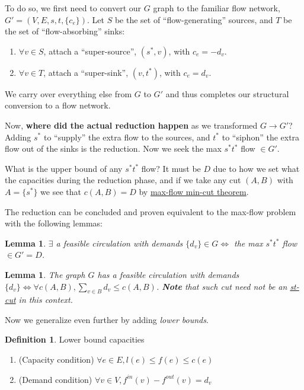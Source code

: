 \documentclass{article}
\newtheorem{lemma}[theorem]{Lemma}
\theoremstyle{definition}
\newtheorem{definition}{Definition}[section]
\begin{document}

To do so, we first need to convert our $G$ graph to the familiar flow network, \hyperref[def:flow_networks]{$G' = (V, E, s,t, \{c_e\})$}.
Let $S$ be the set of ``flow-generating'' sources, and $T$ be the set of ``flow-absorbing'' sinks:

\begin{enumerate}
	\item $\forall v \in S$, attach a ``super-source'', $(s^*,v)$, with $c_e = -d_v$.
	\item $\forall v \in T$, attach a ``super-sink'', $(v,t^*)$, with $c_e = d_v$.
\end{enumerate}

We carry over everything else from $G$ to $G'$ and thus completes our structural conversion to a flow network. 

Now, \textbf{where did the actual reduction happen} as we transformed $G \to G'$? Adding $s^*$ to ``supply'' the extra flow to the sources, and $t^*$ to ``siphon'' the extra flow out of the sinks is the reduction. Now we seek the max $s^*t^*$ flow $\in G'$. 

What is the upper bound of any $s^*t^*$ flow? It must be $D$ due to how we set what the capacities during the reduction phase, and if we take any cut $(A,B)$ with $A = \{s^*\}$ we see that $c(A,B) = D$ by \hyperref[thm:maxflowmincut]{max-flow min-cut theorem}.

The reduction can be concluded and proven equivalent to the max-flow problem with the following lemmas:

\begin{lemma}
	$\exists$ a feasible circulation with demands $\{d_v\} \in G \iff$ the max $s^*t^*$ flow $\in G' = D$. 
\end{lemma}

\begin{lemma}
	The graph $G$ has a feasible circulation with demands $\{d_v\} \iff \forall c(A,B), \sum_{v \in B}{d_v \leq c(A,B)}$. \textbf{Note} that such cut need not be an \hyperref[def:st_cut_cap]{st-cut} in this context.
\end{lemma}

Now we generalize even further by adding \textit{lower bounds}. 

\begin{definition}{Lower bound capacities}
	\label{def:low_bounds}	
		\begin{enumerate}
			\item (Capacity condition) $\forall e \in E, l(e) \leq f(e) \leq c(e)$
			\item (Demand condition) $\forall v \in V, f^{in}(v) - f^{out}(v) = d_v$
		\end{enumerate}
\end{definition}
\end{document}

